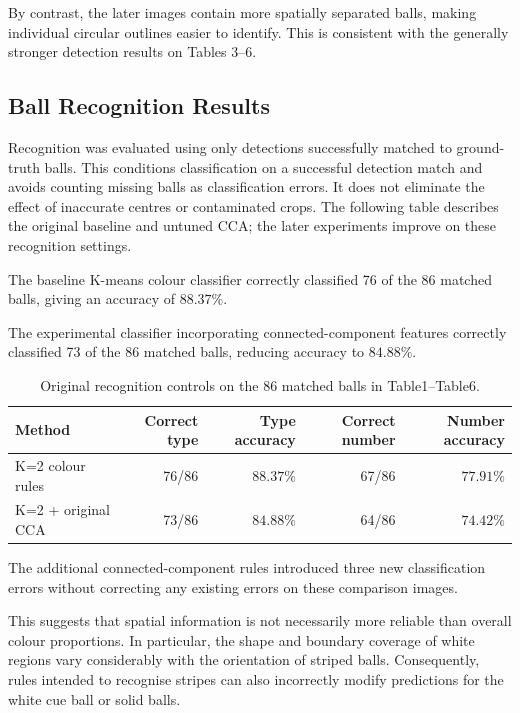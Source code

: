 \documentclass[10pt,a4paper]{article}
\begin{document}
By contrast, the later images contain more spatially separated balls, making 
individual circular outlines easier to identify. This is consistent with the 
generally stronger detection results on Tables 3–6.

\subsection{Ball Recognition Results}

Recognition was evaluated using only detections successfully matched to
ground-truth balls. This conditions classification on a successful detection
match and avoids counting missing balls as classification errors. It does
not eliminate the effect of inaccurate centres or contaminated crops.
The following table describes the original baseline and untuned CCA;
the later experiments improve on these recognition settings.

The baseline K-means colour classifier correctly classified 76 of the 86 
matched balls, giving an accuracy of $88.37\%$.

The experimental classifier incorporating connected-component features 
correctly classified 73 of the 86 matched balls, reducing accuracy to $84.88\%$.

\begin{table}[htbp]
    \centering
    \caption{Original recognition controls on the 86 matched balls in Table1--Table6.}
    \label{tab:recognition-results}
    \begin{tabular}{lrrrr}
        \toprule
        Method & Correct type & Type accuracy & Correct number & Number accuracy \\
        \midrule
        K=2 colour rules & 76/86 & $88.37\%$ & 67/86 & $77.91\%$ \\
        K=2 + original CCA & 73/86 & $84.88\%$ & 64/86 & $74.42\%$ \\
        \bottomrule
    \end{tabular}
\end{table}
\FloatBarrier

The additional connected-component rules introduced three new classification 
errors without correcting any existing errors on these comparison images.

This suggests that spatial information is not necessarily more reliable than 
overall colour proportions. In particular, the shape and boundary coverage of 
white regions vary considerably with the orientation of striped balls. 
Consequently, rules intended to recognise stripes can also incorrectly modify 
predictions for the white cue ball or solid balls.
\end{document}
